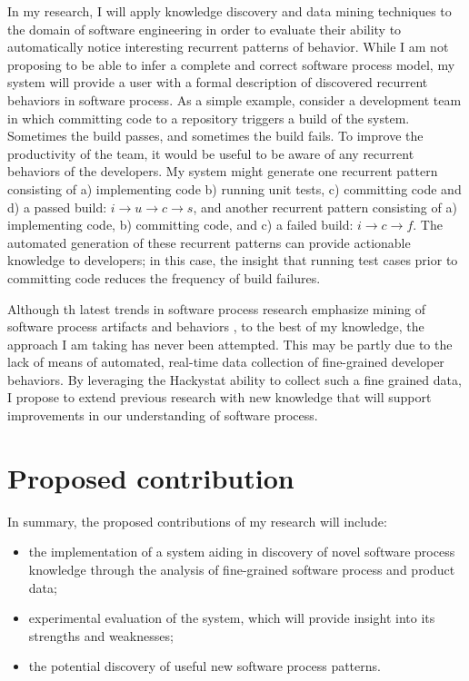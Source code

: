 In my research, I will apply knowledge discovery and data mining techniques to the domain of software engineering in order to evaluate their ability to automatically notice interesting recurrent patterns of behavior. While I am not proposing to be able to infer a complete and correct software process model, my system will provide a user with a formal description of discovered recurrent behaviors in software process. As a simple example, consider a development team in which committing code to a repository triggers a build of the system. Sometimes the build passes, and sometimes the build fails. To improve the productivity of the team, it would be useful to be aware of any recurrent behaviors of the developers. My system might generate one recurrent pattern consisting of a) implementing code b) running unit tests, c) committing code and d) a passed build: $i \rightarrow u \rightarrow c \rightarrow s $, and another recurrent pattern consisting of a) implementing code, b) committing code, and c) a failed build: $i \rightarrow c \rightarrow f $. The automated generation of these recurrent patterns can provide actionable knowledge to developers; in this case, the insight that running test cases prior to committing code reduces the frequency of build failures.

Although th latest trends in software process research emphasize mining of software process artifacts and behaviors \cite{citeulike:5043664} \cite{citeulike:1885717} \cite{citeulike:5112229} \cite{citeulike:1885717}, to the best of my knowledge, the approach I am taking has never been attempted. This may be partly due to the lack of means of automated, real-time data collection of fine-grained developer behaviors. By leveraging the Hackystat ability to collect such a fine grained data, I propose to extend previous research with new knowledge that will support improvements in our understanding of software process.

\section{Proposed contribution}
In summary, the proposed contributions of my research will include: 
\begin{itemize}
	\item the implementation of a system aiding in discovery of novel software process knowledge through the analysis of fine-grained software process and product data;
	\item experimental evaluation of the system, which will provide insight into its strengths and weaknesses;
	\item the potential discovery of useful new software process patterns.
\end{itemize}

